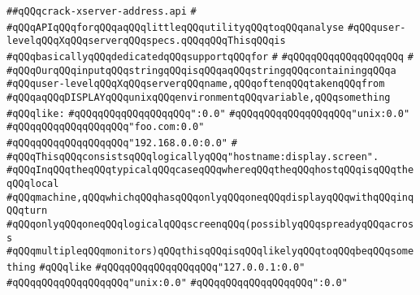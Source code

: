 \label{src/lib/x-kit/xclient/src/wire/crack-xserver-address.api}
\verb|##qQQqcrack-xserver-address.api|\newline
\verb|#|\newline
\verb|#qQQqAPIqQQqforqQQqaqQQqlittleqQQqutilityqQQqtoqQQqanalyse|\newline
\verb|#qQQquser-levelqQQqXqQQqserverqQQqspecs.qQQqqQQqThisqQQqis|\newline
\verb|#qQQqbasicallyqQQqdedicatedqQQqsupportqQQqfor|\newline
\verb|#|\newline
\verb|#qQQqqQQqqQQqqQQqqQQq|\newline
\verb|#|\newline
\verb|#qQQqOurqQQqinputqQQqstringqQQqisqQQqaqQQqstringqQQqcontainingqQQqa|\newline
\verb|#qQQquser-levelqQQqXqQQqserverqQQqname,qQQqoftenqQQqtakenqQQqfrom|\newline
\verb|#qQQqaqQQqDISPLAYqQQqunixqQQqenvironmentqQQqvariable,qQQqsomething|\newline
\verb|#qQQqlike:|\newline
\verb|#qQQqqQQqqQQqqQQqqQQq":0.0"|\newline
\verb|#qQQqqQQqqQQqqQQqqQQq"unix:0.0"|\newline
\verb|#qQQqqQQqqQQqqQQqqQQq"foo.com:0.0"|\newline
\verb|#qQQqqQQqqQQqqQQqqQQq"192.168.0.0:0.0"|\newline
\verb|#|\newline
\verb|#qQQqThisqQQqconsistsqQQqlogicallyqQQq"hostname:display.screen".|\newline
\verb|#qQQqInqQQqtheqQQqtypicalqQQqcaseqQQqwhereqQQqtheqQQqhostqQQqisqQQqtheqQQqlocal|\newline
\verb|#qQQqmachine,qQQqwhichqQQqhasqQQqonlyqQQqoneqQQqdisplayqQQqwithqQQqinqQQqturn|\newline
\verb|#qQQqonlyqQQqoneqQQqlogicalqQQqscreenqQQq(possiblyqQQqspreadyqQQqacross|\newline
\verb|#qQQqmultipleqQQqmonitors)qQQqthisqQQqisqQQqlikelyqQQqtoqQQqbeqQQqsomething|\newline
\verb|#qQQqlike|\newline
\verb|#qQQqqQQqqQQqqQQqqQQq"127.0.0.1:0.0"|\newline
\verb|#qQQqqQQqqQQqqQQqqQQq"unix:0.0"|\newline
\verb|#qQQqqQQqqQQqqQQqqQQq":0.0"|\newline

